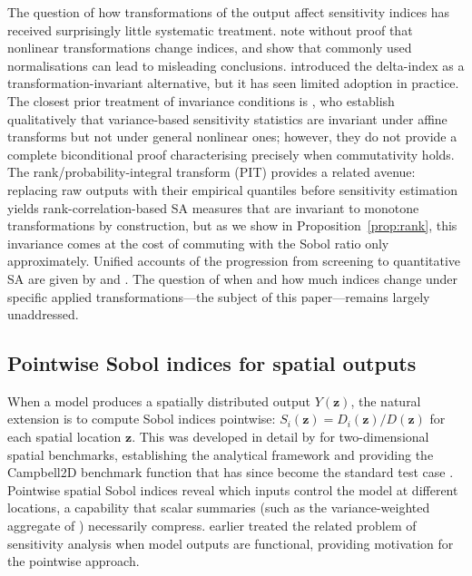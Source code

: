 \documentclass[11pt,onecolumn]{article}
\begin{document}
The question of how transformations of the output affect sensitivity indices
has received surprisingly little systematic treatment. \citet{Saltelli2008}
note without proof that nonlinear transformations change indices, and
\citet{Puy2022} show that commonly used normalisations can lead to misleading
conclusions. \citet{Borgonovo2007} introduced the delta-index as a
transformation-invariant alternative, but it has seen limited adoption in
practice. The closest prior treatment of invariance conditions is
\citet{Borgonovo2014}, who establish qualitatively that variance-based
sensitivity statistics are invariant under affine transforms but not under
general nonlinear ones; however, they do not provide a complete biconditional
proof characterising precisely when commutativity holds.
The rank/probability-integral transform (PIT) provides a related avenue: replacing
raw outputs with their empirical quantiles before sensitivity estimation yields
rank-correlation-based SA measures \citep{Iman1979} that are invariant to
monotone transformations by construction, but as we show in
Proposition~\ref{prop:rank}, this invariance comes at the cost of commuting with
the Sobol ratio only approximately. Unified accounts of the progression from
screening to quantitative SA are given by \citet{Campolongo2011} and
\citet{PlischkeBorgonovo2013}.
The question of when and how much indices change under specific
applied transformations---the subject of this paper---remains largely unaddressed.

\subsection{Pointwise Sobol indices for spatial outputs}
\label{sec:lit_spatial}

When a model produces a spatially distributed output $Y(\mathbf{z})$, the
natural extension is to compute Sobol indices pointwise:
$S_i(\mathbf{z}) = D_i(\mathbf{z}) / D(\mathbf{z})$ for each spatial location
$\mathbf{z}$. This was developed in detail by \citet{MarrelSpatial2011} for
two-dimensional spatial benchmarks, establishing the analytical framework and
providing the Campbell2D benchmark function that has since become the standard
test case \citep{Marrel2011}. Pointwise spatial Sobol indices reveal which inputs control the model
at different locations, a capability that scalar summaries (such as the
variance-weighted aggregate of \citealt{MarrelSpatial2011}) necessarily compress.
\citet{Campbell2006} earlier treated the related problem of sensitivity analysis
when model outputs are functional, providing motivation for the pointwise approach.
\end{document}
